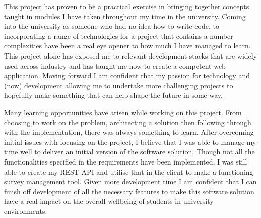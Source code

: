 This project has proven to be a practical exercise in bringing together concepts taught in modules I have taken throughout my time in the university.
Coming into the university as someone who had no idea how to write code, to incorporating a range of technologies for a project that contains a number 
complexities have been a real eye opener to how much I have managed to learn.
This project alone has exposed me to relevant development stacks that are widely used across industry and has taught me how to create a competent 
web application.
Moving forward I am confident that my passion for technology and (now) development allowing me to undertake more challenging projects to hopefully make something that can help shape the future in some way.

Many learning opportunities have arisen while working on this project.
From choosing to work on the problem, architecting a solution then following through with the implementation, there was always something to learn.
After overcoming initial issues with focusing on the project, I believe that I was able to manage my time well to deliver an initial version of the
software solution.
Though not all the functionalities specified in the requirements have been implemented, I was still able to create my REST API and utilise that 
in the client to make a functioning survey management tool.
Given more development time I am confident that I can finish off development of all the necessary features to make this software solution have a real 
impact on the overall wellbeing of students in university environments.
